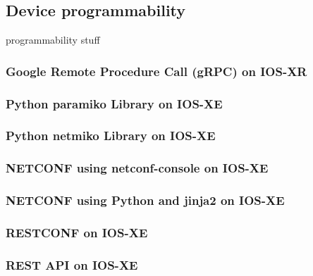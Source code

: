 \subsection{Device programmability}
programmability stuff

\subsubsection{Google Remote Procedure Call (gRPC) on IOS-XR}
\subsubsection{Python paramiko Library on IOS-XE}
\subsubsection{Python netmiko Library on IOS-XE}
\subsubsection{NETCONF using netconf-console on IOS-XE}
\subsubsection{NETCONF using Python and jinja2 on IOS-XE}
\subsubsection{RESTCONF on IOS-XE}
\subsubsection{REST API on IOS-XE}
